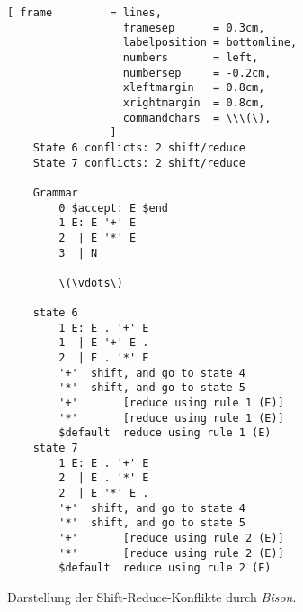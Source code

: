 \begin{figure}[!ht]
\centering
\begin{Verbatim}[ frame         = lines, 
                  framesep      = 0.3cm, 
                  labelposition = bottomline,
                  numbers       = left,
                  numbersep     = -0.2cm,
                  xleftmargin   = 0.8cm,
                  xrightmargin  = 0.8cm,
                  commandchars  = \\\(\),
                ]
    State 6 conflicts: 2 shift/reduce
    State 7 conflicts: 2 shift/reduce
    
    Grammar
        0 $accept: E $end
        1 E: E '+' E
        2  | E '*' E
        3  | N

        \(\vdots\)

    state 6    
        1 E: E . '+' E
        1  | E '+' E .
        2  | E . '*' E
        '+'  shift, and go to state 4
        '*'  shift, and go to state 5
        '+'       [reduce using rule 1 (E)]
        '*'       [reduce using rule 1 (E)]
        $default  reduce using rule 1 (E)
    state 7
        1 E: E . '+' E
        2  | E . '*' E
        2  | E '*' E .
        '+'  shift, and go to state 4
        '*'  shift, and go to state 5
        '+'       [reduce using rule 2 (E)]
        '*'       [reduce using rule 2 (E)]
        $default  reduce using rule 2 (E)
\end{Verbatim}
\vspace*{-0.3cm}
\caption{Darstellung der Shift-Reduce-Konflikte durch \textsl{Bison}.}
\label{fig:conflict.output}
\end{figure}
